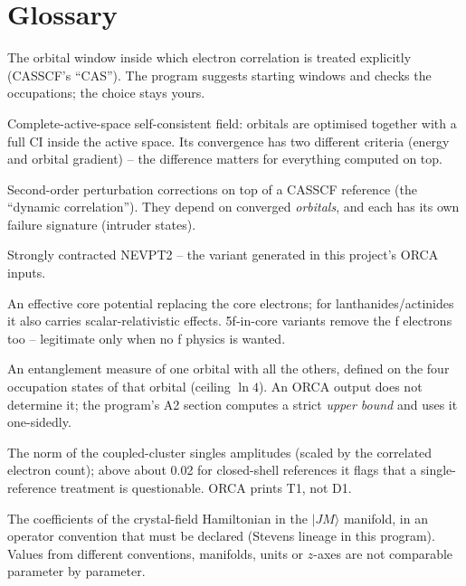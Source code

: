 \chapter{Glossary}
\label{app:glossary}

\begin{description}[leftmargin=0em, style=nextline]
  \item[active space] The orbital window inside which electron correlation is
    treated explicitly (CASSCF's ``CAS''). The program suggests starting
    windows and checks the occupations; the choice stays yours.
  \item[CASSCF] Complete-active-space self-consistent field: orbitals are
    optimised together with a full CI inside the active space. Its convergence
    has two different criteria (energy and orbital gradient) -- the difference
    matters for everything computed on top.
  \item[NEVPT2 / CASPT2] Second-order perturbation corrections on top of a
    CASSCF reference (the ``dynamic correlation''). They depend on converged
    \emph{orbitals}, and each has its own failure signature (intruder states).
  \item[SC-NEVPT2] Strongly contracted NEVPT2 -- the variant generated in this
    project's ORCA inputs.
  \item[ECP / pseudopotential] An effective core potential replacing the core
    electrons; for lanthanides/actinides it also carries scalar-relativistic
    effects. 5f-in-core variants remove the f electrons too -- legitimate only
    when no f physics is wanted.
  \item[single-orbital entropy] An entanglement measure of one orbital with all
    the others, defined on the four occupation states of that orbital
    (ceiling $\ln 4$). An ORCA output does not determine it; the program's A2
    section computes a strict \emph{upper bound} and uses it one-sidedly.
  \item[T1 diagnostic] The norm of the coupled-cluster singles amplitudes
    (scaled by the correlated electron count); above about 0.02 for
    closed-shell references it flags that a single-reference treatment is
    questionable. ORCA prints T1, not D1.
  \item[crystal-field parameters $B_k^q$] The coefficients of the
    crystal-field Hamiltonian in the $|J M\rangle$ manifold, in an operator
    convention that must be declared (Stevens lineage in this program).
    Values from different conventions, manifolds, units or $z$-axes are not
    comparable parameter by parameter.

\end{description}
